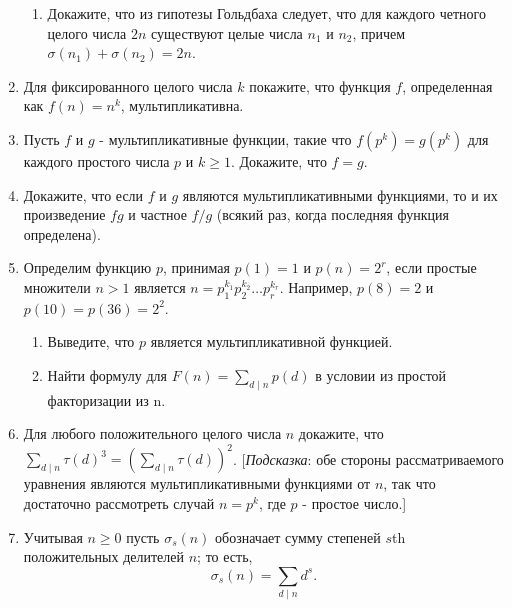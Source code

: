 \documentclass[11pt]{article}
\begin{document}
\begin{enumerate}
\begin{enumerate}
    		\item Докажите, что из гипотезы Гольдбаха следует, что для каждого четного целого числа $2n$ существуют целые числа $n_{1}$ и $n_{2}$, причем $\sigma (n_{1}) + \sigma (n_{2}) = 2n $.
    	\end{enumerate}
        \item Для фиксированного целого числа $k$ покажите, что функция $f$, определенная как
        $f(n)=n^{k}$, мультипликативна.
        \item Пусть $f$ и $g$ - мультипликативные функции, такие что $f(p^{k})=g(p^{k}) $ для каждого простого числа $p$ и $k\ge 1.$ Докажите, что $f = g$.
        \item Докажите, что если $f$ и $g$ являются мультипликативными функциями, то и их произведение $fg$ и частное $f/g$ (всякий раз, когда последняя функция определена).
        \item Определим функцию $p$, принимая $p(1)=1$ и $p(n)=2^{r}$, если простые множители $n > 1$ является $n = p_{1}^{k_{1}}p_{2}^{k_{2}}\ldots p_{r}^{k_{r}}$. Например, $p(8) = 2$ и $p(10) = p(36) = 2^{2}$.
        \begin{enumerate} 
        	\item Выведите, что $p$ является мультипликативной функцией.
        	\item Найти формулу для $F(n) = \sum_{d\mid n}p(d)$ в условии из простой факторизации из n.
        \end{enumerate}
        \item Для любого положительного целого числа $n$ докажите, что $\sum_{d\mid n} \tau(d)^{3} = \left(\sum_{d\mid n}\tau(d)\right)^{2}$. [{\itshape Подсказка}: обе стороны рассматриваемого уравнения являются мультипликативными функциями от $n$, так что достаточно рассмотреть случай $n=p^{k}$, где $p$ - простое число.]
        \item Учитывая $n\ge 0$ пусть $\sigma_{s}(n)$ обозначает сумму степеней $s$th положительных делителей $n$; то есть, $$\sigma_{s}(n)=\sum_{d\mid n}d^{s}.$$
        

\end{enumerate}
\end{document}
